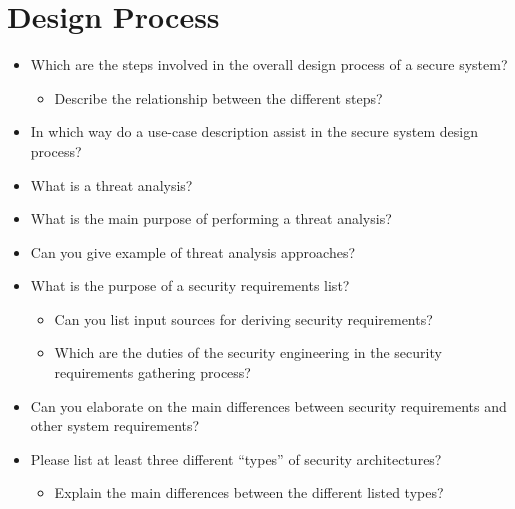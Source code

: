 \section{Design Process}\label{sec:Design_Process}
\begin{itemize}
\item Which are the steps involved in the overall design process of a secure system?
  \begin{itemize}[noitemsep]
  \item Describe the relationship between the different steps?
  \end{itemize}

\item In which way do a use-case description assist in the secure system design process?
\item What is a threat analysis?
\item What is the main purpose of performing a threat analysis?
\item Can you give example of threat analysis approaches?
\item What is the purpose of a security requirements list?
  \begin{itemize}[noitemsep]
  \item Can you list input sources for deriving security requirements?
  \item Which are the duties of the security engineering in the security requirements gathering process?
  \end{itemize}

\item Can you elaborate on the main differences between security requirements and other system requirements?
\item Please list at least three different “types” of security architectures?
  \begin{itemize}[noitemsep]
  \item Explain the main differences between the different listed types?
  \end{itemize}


\end{itemize}
